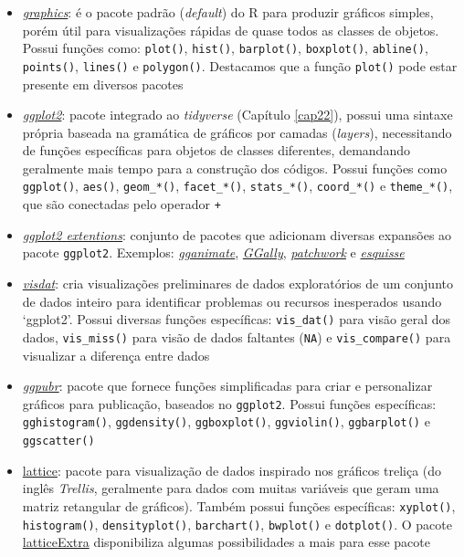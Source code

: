 \documentclass[
]{article}
\begin{document}
\begin{itemize}
\item
  \href{http://search.r-project.org/R/library/graphics/html/00Index.html}{\emph{graphics}}: é o pacote padrão (\emph{default}) do R para produzir gráficos simples, porém útil para visualizações rápidas de quase todos as classes de objetos. Possui funções como: \texttt{plot()}, \texttt{hist()}, \texttt{barplot()}, \texttt{boxplot()}, \texttt{abline()}, \texttt{points()}, \texttt{lines()} e \texttt{polygon()}. Destacamos que a função \texttt{plot()} pode estar presente em diversos pacotes
\item
  \href{https://ggplot2.tidyverse.org/}{\emph{ggplot2}}: pacote integrado ao \emph{tidyverse} (Capítulo \ref{cap22}), possui uma sintaxe própria baseada na gramática de gráficos por camadas (\emph{layers}), necessitando de funções específicas para objetos de classes diferentes, demandando geralmente mais tempo para a construção dos códigos. Possui funções como \texttt{ggplot()}, \texttt{aes()}, \texttt{geom\_*()}, \texttt{facet\_*()}, \texttt{stats\_*()}, \texttt{coord\_*()} e \texttt{theme\_*()}, que são conectadas pelo operador \texttt{+}
\item
  \href{https://exts.ggplot2.tidyverse.org/}{\emph{ggplot2 extentions}}: conjunto de pacotes que adicionam diversas expansões ao pacote \texttt{ggplot2}. Exemplos: \href{https://gganimate.com/}{\emph{gganimate}}, \href{https://ggobi.github.io/ggally/}{\emph{GGally}}, \href{https://patchwork.data-imaginist.com/}{\emph{patchwork}} e \href{https://dreamrs.github.io/esquisse/}{\emph{esquisse}}
\item
  \href{https://docs.ropensci.org/visdat/}{\emph{visdat}}: cria visualizações preliminares de dados exploratórios de um conjunto de dados inteiro para identificar problemas ou recursos inesperados usando `ggplot2'. Possui diversas funções específicas: \texttt{vis\_dat()} para visão geral dos dados, \texttt{vis\_miss()} para visão de dados faltantes (\texttt{NA}) e \texttt{vis\_compare()} para visualizar a diferença entre dados
\item
  \href{https://rpkgs.datanovia.com/ggpubr/}{\emph{ggpubr}}: pacote que fornece funções simplificadas para criar e personalizar gráficos para publicação, baseados no \texttt{ggplot2}. Possui funções específicas: \texttt{gghistogram()}, \texttt{ggdensity()}, \texttt{ggboxplot()}, \texttt{ggviolin()}, \texttt{ggbarplot()} e \texttt{ggscatter()}
\item
  \href{http://lattice.r-forge.r-project.org/}{lattice}: pacote para visualização de dados inspirado nos gráficos treliça (do inglês \emph{Trellis}, geralmente para dados com muitas variáveis que geram uma matriz retangular de gráficos). Também possui funções específicas: \texttt{xyplot()}, \texttt{histogram()}, \texttt{densityplot()}, \texttt{barchart()}, \texttt{bwplot()} e \texttt{dotplot()}. O pacote \href{http://latticeextra.r-forge.r-project.org/}{latticeExtra} disponibiliza algumas possibilidades a mais para esse pacote

\end{itemize}
\end{document}
